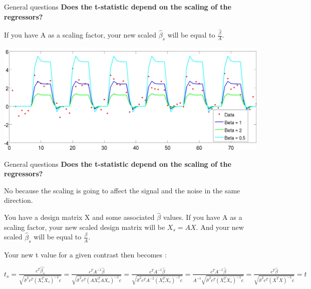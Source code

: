 \documentclass{beamer}
\begin{document}
\begin{frame}{General questions}
\textbf{Does the t-statistic depend on the scaling of the regressors?}

\smallskip
If you have A as a scaling factor, your new scaled $\hat{\beta}_{s}$ will be equal to $\frac{\hat{\beta}}{A}$.
    \begin{center}
      \includegraphics[scale=0.079,keepaspectratio=true]{./Scaling_Regressors.jpg}
    \end{center}
\end{frame} 


\begin{frame}{General questions}
\textbf{Does the t-statistic depend on the scaling of the regressors?}

\smallskip
No because the scaling is going to affect the signal and the noise in the same direction.

You have a design matrix X and some associated $\hat{\beta}$ values. If you have A as a scaling factor, your new scaled design matrix will be $X_{s}=AX$. And your new scaled $\hat{\beta}_{s}$ will be equal to $\frac{\beta}{A}$.

Your new t value for a given contrast then becomes :
  \begin{center}
    $t_{s} = \frac{ c^T \hat{\beta_{s}} } { \sqrt{ \hat{\sigma}^{2} c^{T} (X_{s}^{T} X_{s})^{-1} c } }
    = \frac{ c^{T} A^{-1} \hat{\beta} } { \sqrt{ \hat{\sigma}^{2} c^{T}  (A X_{s}^{T} A X_{s})^{-1} c } }
    = \frac{ c^{T} A^{-1} \hat{\beta} } { \sqrt{ \hat{\sigma}^{2} c^{T}  A^{-2} (X_{s}^{T} X_{s})^{-1} c } }
    = \frac{ c^{T} A^{-1} \hat{\beta} } { A^{-1} \sqrt{ \hat{\sigma}^{2} c^{T} (X_{s}^{T} X_{s})^{-1} c } }
    = \frac{ c^{T} \hat{\beta} } { \sqrt{ \hat{\sigma}^{2} c^{T} (X^{T} X)^{-1} c } } = t$
  \end{center}
\end{frame}  
\end{document}
